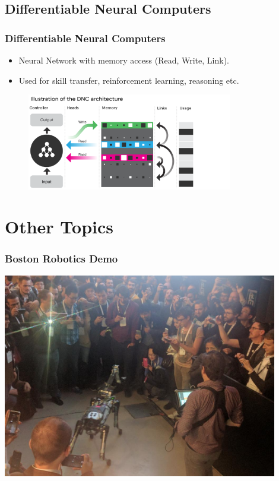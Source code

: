 \documentclass[11pt,
               hyperref={colorlinks,citecolor=pink,linkcolor=red,urlcolor=blue}
               ]{beamer}
\begin{document}
  \subsection{Differentiable Neural Computers}

  \begin{frame}
    \frametitle{Differentiable Neural Computers}

    \begin{itemize}
      \item Neural Network with memory access (Read, Write, Link).
      \item Used for skill transfer, reinforcement learning, reasoning etc.
    \end{itemize}

    \begin{figure}
      \centering
      \includegraphics[width=0.8\textwidth]{dnc.png}
    \end{figure}

  \end{frame}

  \section{Other Topics}

  \begin{frame}
    \frametitle{Boston Robotics Demo}

    \begin{center}
      \href{run:./Videos/BostonDyn.avi?loop}{\includegraphics[width=0.9\textwidth]{./Videos/BostonDyn.png}}
    \end{center}

  \end{frame}
\end{document}
